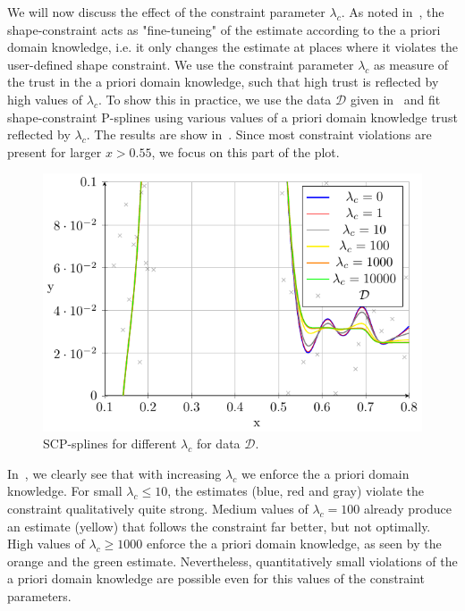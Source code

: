 We will now discuss the effect of the constraint parameter $\lambda_c$. As noted in~, the shape-constraint acts as "fine-tuneing" of the estimate according to the a priori domain knowledge, i.e. it only changes the estimate at places where it violates the user-defined shape constraint. We use the constraint parameter $\lambda_c$ as measure of the trust in the a priori domain knowledge, such that high trust is reflected by high values of $\lambda_c$. To show this in practice, we use the data $\mathcal{D}$ given in~ and fit shape-constraint P-splines using various values of a priori domain knowledge trust reflected by $\lambda_c$. The results are show in~. Since most constraint violations are present for larger $x > 0.55$, we focus on this part of the plot. 

\begin{figure}[H]
	\centering
	\includegraphics{graphics/pgfplots/cha4/exp-lambdas.pdf}
	\caption{SCP-splines for different $\lambda_c$ for data $\mathcal{D}$.}
	\label{fig:example-lambdas}
\end{figure}	

In~, we clearly see that with increasing $\lambda_c$ we enforce the a priori domain knowledge. For small $\lambda_c \le 10$, the estimates (blue, red and gray) violate the constraint qualitatively quite strong. Medium values of $\lambda_c = 100$ already produce an estimate (yellow) that follows the constraint far better, but not optimally. High values of $\lambda_c \ge 1000$ enforce the a priori domain knowledge, as seen by the orange and the green estimate. Nevertheless, quantitatively small violations of the a priori domain knowledge are possible even for this values of the constraint parameters. 
